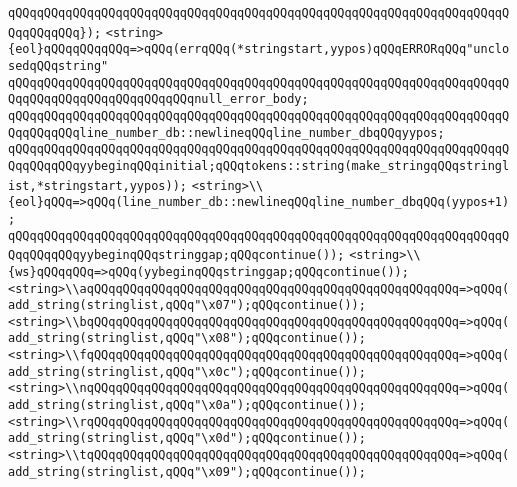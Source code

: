 \verb|qQQqqQQqqQQqqQQqqQQqqQQqqQQqqQQqqQQqqQQqqQQqqQQqqQQqqQQqqQQqqQQqqQQqqQQqqQQqqQQq});|\newline
\verb|<string>{eol}qQQqqQQqqQQq=>qQQq(errqQQq(*stringstart,yypos)qQQqERRORqQQq"unclosedqQQqstring"|\newline
\verb|qQQqqQQqqQQqqQQqqQQqqQQqqQQqqQQqqQQqqQQqqQQqqQQqqQQqqQQqqQQqqQQqqQQqqQQqqQQqqQQqqQQqqQQqqQQqqQQqnull_error_body;|\newline
\verb|qQQqqQQqqQQqqQQqqQQqqQQqqQQqqQQqqQQqqQQqqQQqqQQqqQQqqQQqqQQqqQQqqQQqqQQqqQQqqQQqline_number_db::newlineqQQqline_number_dbqQQqyypos;|\newline
\verb|qQQqqQQqqQQqqQQqqQQqqQQqqQQqqQQqqQQqqQQqqQQqqQQqqQQqqQQqqQQqqQQqqQQqqQQqqQQqqQQqyybeginqQQqinitial;qQQqtokens::string(make_stringqQQqstringlist,*stringstart,yypos));|\newline
\verb|<string>\\{eol}qQQq=>qQQq(line_number_db::newlineqQQqline_number_dbqQQq(yypos+1);|\newline
\verb|qQQqqQQqqQQqqQQqqQQqqQQqqQQqqQQqqQQqqQQqqQQqqQQqqQQqqQQqqQQqqQQqqQQqqQQqqQQqqQQqyybeginqQQqstringgap;qQQqcontinue());|\newline
\verb|<string>\\{ws}qQQqqQQq=>qQQq(yybeginqQQqstringgap;qQQqcontinue());|\newline
\verb|<string>\\aqQQqqQQqqQQqqQQqqQQqqQQqqQQqqQQqqQQqqQQqqQQqqQQqqQQq=>qQQq(add_string(stringlist,qQQq"\x07");qQQqcontinue());|\newline
\verb|<string>\\bqQQqqQQqqQQqqQQqqQQqqQQqqQQqqQQqqQQqqQQqqQQqqQQqqQQq=>qQQq(add_string(stringlist,qQQq"\x08");qQQqcontinue());|\newline
\verb|<string>\\fqQQqqQQqqQQqqQQqqQQqqQQqqQQqqQQqqQQqqQQqqQQqqQQqqQQq=>qQQq(add_string(stringlist,qQQq"\x0c");qQQqcontinue());|\newline
\verb|<string>\\nqQQqqQQqqQQqqQQqqQQqqQQqqQQqqQQqqQQqqQQqqQQqqQQqqQQq=>qQQq(add_string(stringlist,qQQq"\x0a");qQQqcontinue());|\newline
\verb|<string>\\rqQQqqQQqqQQqqQQqqQQqqQQqqQQqqQQqqQQqqQQqqQQqqQQqqQQq=>qQQq(add_string(stringlist,qQQq"\x0d");qQQqcontinue());|\newline
\verb|<string>\\tqQQqqQQqqQQqqQQqqQQqqQQqqQQqqQQqqQQqqQQqqQQqqQQqqQQq=>qQQq(add_string(stringlist,qQQq"\x09");qQQqcontinue());|\newline
